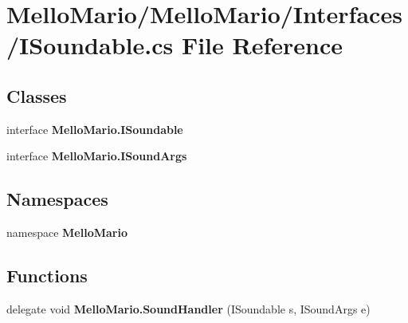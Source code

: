 \section{Mello\+Mario/\+Mello\+Mario/\+Interfaces/\+I\+Soundable.cs File Reference}
\label{ISoundable_8cs}
\subsection*{Classes}
\begin{DoxyCompactItemize}
\item 
interface \textbf{ Mello\+Mario.\+I\+Soundable}
\item 
interface \textbf{ Mello\+Mario.\+I\+Sound\+Args}
\end{DoxyCompactItemize}
\subsection*{Namespaces}
\begin{DoxyCompactItemize}
\item 
namespace \textbf{ Mello\+Mario}
\end{DoxyCompactItemize}
\subsection*{Functions}
\begin{DoxyCompactItemize}
\item 
delegate void \textbf{ Mello\+Mario.\+Sound\+Handler} (I\+Soundable s, I\+Sound\+Args e)
\end{DoxyCompactItemize}
